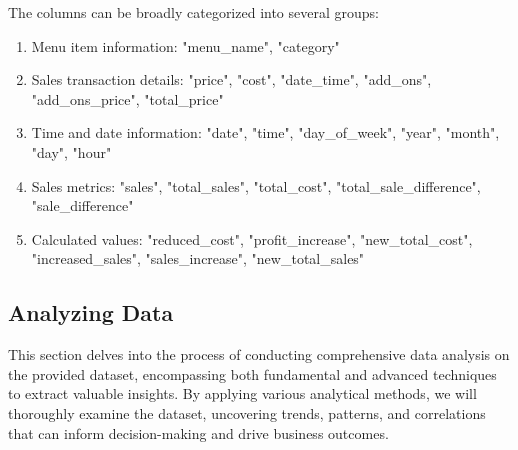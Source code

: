 The columns can be broadly categorized into several groups:

\begin{enumerate}
	\item Menu item information: "menu{\_}name", "category"
	\item Sales transaction details: "price", "cost", "date{\_}time", "add{\_}ons", "add{\_}ons{\_}price", "total{\_}price"
	\item Time and date information: "date", "time", "day{\_}of{\_}week", "year", "month", "day", "hour"
	\item Sales metrics: "sales", "total{\_}sales", "total{\_}cost", "total{\_}sale{\_}difference", "sale{\_}difference"
	\item Calculated values: "reduced{\_}cost", "profit{\_}increase", "new{\_}total{\_}cost", "increased{\_}sales", "sales{\_}increase", "new{\_}total{\_}sales"
\end{enumerate}

\subsection{Analyzing Data}

This section delves into the process of conducting comprehensive data analysis on the provided dataset, encompassing both fundamental and advanced techniques to extract valuable insights. By applying various analytical methods, we will thoroughly examine the dataset, uncovering trends, patterns, and correlations that can inform decision-making and drive business outcomes.
	










